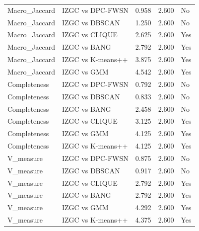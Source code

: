 \begin{table}[ht]
\begin{tabular}{lllll}
Macro_Jaccard & IZGC vs DPC-FWSN & 0.958 & 2.600 & No\\
Macro_Jaccard & IZGC vs DBSCAN & 1.250 & 2.600 & No\\
Macro_Jaccard & IZGC vs CLIQUE & 2.625 & 2.600 & Yes\\
Macro_Jaccard & IZGC vs BANG & 2.792 & 2.600 & Yes\\
Macro_Jaccard & IZGC vs K-means++ & 3.875 & 2.600 & Yes\\
Macro_Jaccard & IZGC vs GMM & 4.542 & 2.600 & Yes\\
Completeness & IZGC vs DPC-FWSN & 0.792 & 2.600 & No\\
Completeness & IZGC vs DBSCAN & 0.833 & 2.600 & No\\
Completeness & IZGC vs BANG & 2.458 & 2.600 & No\\
Completeness & IZGC vs CLIQUE & 3.125 & 2.600 & Yes\\
Completeness & IZGC vs GMM & 4.125 & 2.600 & Yes\\
Completeness & IZGC vs K-means++ & 4.125 & 2.600 & Yes\\
V_measure & IZGC vs DPC-FWSN & 0.875 & 2.600 & No\\
V_measure & IZGC vs DBSCAN & 0.917 & 2.600 & No\\
V_measure & IZGC vs CLIQUE & 2.792 & 2.600 & Yes\\
V_measure & IZGC vs BANG & 2.792 & 2.600 & Yes\\
V_measure & IZGC vs GMM & 4.292 & 2.600 & Yes\\
V_measure & IZGC vs K-means++ & 4.375 & 2.600 & Yes\\

\bottomrule

\end{tabular}

\end{table}
